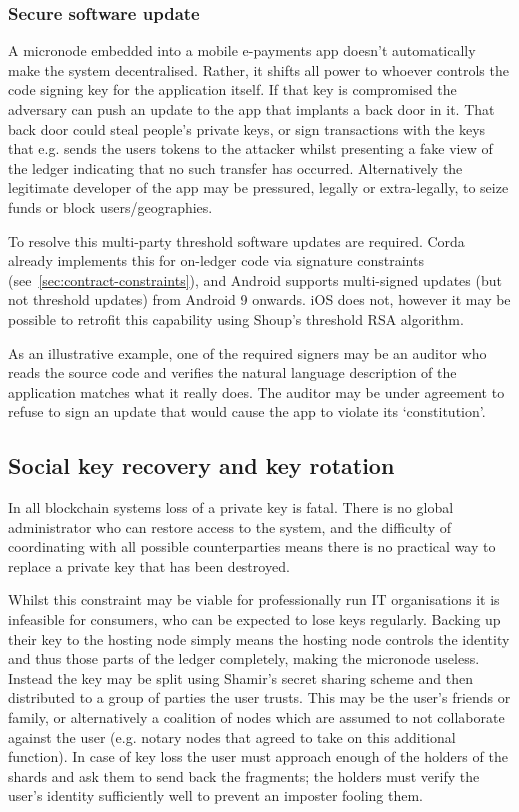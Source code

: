 \documentclass{article}
\begin{document}
\subsubsection{Secure software update}

A micronode embedded into a mobile e-payments app doesn't automatically make the system decentralised. Rather, it
shifts all power to whoever controls the code signing key for the application itself. If that key is compromised
the adversary can push an update to the app that implants a back door in it. That back door could steal people's
private keys, or sign transactions with the keys that e.g. sends the users tokens to the attacker whilst presenting
a fake view of the ledger indicating that no such transfer has occurred. Alternatively the legitimate developer of
the app may be pressured, legally or extra-legally, to seize funds or block users/geographies.

To resolve this multi-party threshold software updates are required. Corda already implements this for on-ledger
code via signature constraints (see~\cref{sec:contract-constraints}), and Android supports multi-signed updates
(but not threshold updates) from Android 9 onwards. iOS does not, however it may be possible to retrofit this
capability using Shoup's threshold RSA algorithm\cite{shoup2000practical}.

As an illustrative example, one of the required signers may be an auditor who reads the source code and verifies
the natural language description of the application matches what it really does. The auditor may be under agreement
to refuse to sign an update that would cause the app to violate its `constitution'.

\subsection{Social key recovery and key rotation}\label{subsec:social-key-recovery-and-key-rotation}

In all blockchain systems loss of a private key is fatal. There is no global administrator who can restore access
to the system, and the difficulty of coordinating with all possible counterparties means there is no practical
way to replace a private key that has been destroyed.

Whilst this constraint may be viable for professionally run IT organisations it is infeasible for consumers, who
can be expected to lose keys regularly. Backing up their key to the hosting node simply means the hosting node
controls the identity and thus those parts of the ledger completely, making the micronode useless. Instead the key
may be split using Shamir's secret sharing scheme\cite{Shamir:1979:SS:359168.359176} and then distributed to a
group of parties the user trusts. This may be the user's friends or family, or alternatively a coalition of nodes
which are assumed to not collaborate against the user (e.g. notary nodes that agreed to take on this additional
function). In case of key loss the user must approach enough of the holders of the shards and ask them to send back
the fragments; the holders must verify the user's identity sufficiently well to prevent an imposter fooling them.
\end{document}
